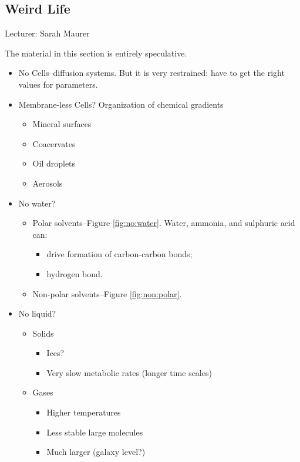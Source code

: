 \documentclass[]{article}
\begin{document}
\subsection{Weird Life}

Lecturer: Sarah Maurer

The material in this section is entirely speculative.

\begin{itemize}
	\item No Cells--diffusion systems. But it is very restrained: have to get the right values for parameters.
	\item Membrane-less Cells? Organization of 	chemical gradients\cite{hollants2011life}\cite{kim2001life}
	\begin{itemize}
		\item Mineral surfaces
		\item Coacervates
		\item Oil droplets
		\item Aerosols
	\end{itemize}
	\item No water? 
	\begin{itemize}
		\item Polar solvents\cite[Chapter 6]{board2007limits}--Figure \ref{fig:no:water}. Water, ammonia, and sulphuric acid can:
			\begin{itemize}
				\item drive formation of carbon-carbon bonds;
				\item hydrogen bond.
			\end{itemize}
		\item Non-polar solvents\cite{cejkova2014dynamics}--Figure \ref{fig:non:polar}.
	\end{itemize}
	\item No liquid?\cite[Chapter 6]{board2007limits}
	\begin{itemize}
		\item Solids
		\begin{itemize}
			\item Ices?
			\item Very slow metabolic rates (longer time scales)
		\end{itemize}
		\item Gases
		\begin{itemize}
			\item Higher temperatures
			\item Less stable large molecules
			\item Much larger (galaxy level?)
		\end{itemize}
	\end{itemize}
\end{itemize}
\end{document}
